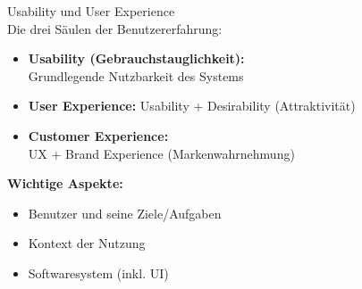 \begin{concept}{Usability und User Experience}\\
Die drei Säulen der Benutzererfahrung:
\begin{itemize}
    \item \textbf{Usability (Gebrauchstauglichkeit):} \\ Grundlegende Nutzbarkeit des Systems
    \item \textbf{User Experience:} Usability + Desirability (Attraktivität)
    \item \textbf{Customer Experience:} \\ UX + Brand Experience (Markenwahrnehmung)
\end{itemize}

\textbf{Wichtige Aspekte:}
\begin{itemize}
    \item Benutzer und seine Ziele/Aufgaben
    \item Kontext der Nutzung
    \item Softwaresystem (inkl. UI)
\end{itemize}
\end{concept}

